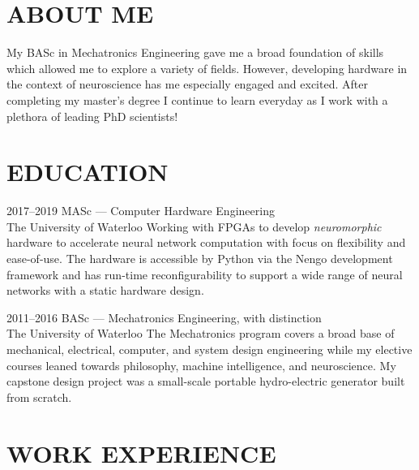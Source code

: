 \documentclass[a4paper,nocolors]{cv-friggeri-ben}
\begin{document}

\section{ABOUT ME}
\vspace{-2pt}

\vspace{-5pt}
My BASc in Mechatronics Engineering gave me a broad foundation of skills which
allowed me to explore a variety of fields. However, developing hardware in the
context of neuroscience has me especially engaged and excited. After completing
my master's degree I continue to learn everyday as I work with a plethora of
leading PhD scientists!



\section{EDUCATION}
\vspace{-2pt}

\begin{entrylist}

\entry
    {2017--2019}
    {MASc {\normalfont --- Computer Hardware Engineering}}
    {\\The University of Waterloo}
    {Working with FPGAs to develop \textit{neuromorphic} hardware to
    accelerate neural network computation with focus on flexibility and
    ease-of-use. The hardware is accessible by Python via the Nengo development
    framework and has run-time reconfigurability to support a wide range of
    neural networks with a static hardware design.}

\entry
    {2011--2016}
    {BASc {\normalfont --- Mechatronics Engineering, with distinction}}
    {\\The University of Waterloo}
    {The Mechatronics program covers a broad base of mechanical, electrical,
    computer, and system design engineering while my elective courses leaned
    towards philosophy, machine intelligence, and neuroscience. My capstone
    design project was a small-scale portable hydro-electric generator built
    from scratch.}

\end{entrylist}


\section{WORK EXPERIENCE}
\vspace{-2pt}
\end{document}
